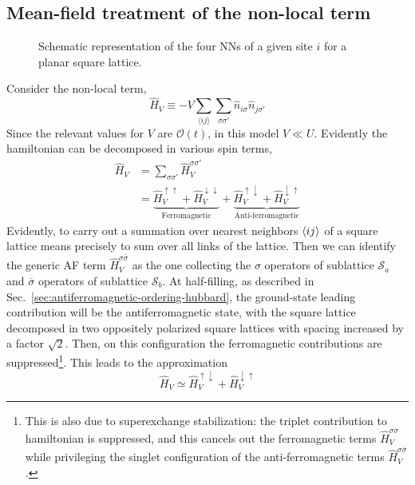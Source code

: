 \subsection{Mean-field treatment of the non-local term}

\begin{figure}
	\centering
	
	\caption{Schematic representation of the four NNs of a given site $i$ for a planar square lattice.}
	\label{fig:square-nearest-neighbors}
\end{figure}

Consider the non-local term,
\begin{equation}\label{eq:extended-hubbard-nonlocal-interaction}
	\hat H_V \equiv - V \sum_{\langle ij \rangle} \sum_{\sigma \sigma'} \hat n_{i\sigma} \hat n_{j\sigma'}
\end{equation}
{\color{tabred}Since the relevant values for $V$ are $\mathcal{O}(t)$, in this model $V \ll U$.} Evidently the hamiltonian can be decomposed in various spin terms,
\[
\begin{aligned}
	\hat H_V &= \sum_{\sigma \sigma'} \hat H_V^{\sigma\sigma'} \\
	&= \underbrace{
		\hat H_V^{\uparrow\uparrow} + \hat H_V^{\downarrow\downarrow}
	}_\text{Ferromagnetic} + \underbrace{
		\hat H_V^{\uparrow\downarrow} + \hat H_V^{\downarrow\uparrow}
	}_\text{Anti-ferromagnetic}
\end{aligned}
\]
Evidently, to carry out a summation over nearest neighbors $\ev{ij}$ of a square lattice means precisely to sum over all links of the lattice. Then we can identify the generic AF term $\hat H_V^{\sigma \overline{\sigma}}$ as the one collecting the $\sigma$ operators of sublattice $\mathcal{S}_a$ and $\overline{\sigma}$ operators of sublattice $\mathcal{S}_b$. At half-filling, as described in Sec.~\ref{sec:antiferromagnetic-ordering-hubbard}, the ground-state leading contribution will be the antiferromagnetic state, with the square lattice decomposed in two oppositely polarized square lattices with spacing increased by a factor $\sqrt{2}$. Then, on this configuration the ferromagnetic contributions are suppressed\footnote{
	This is also due to superexchange stabilization: the triplet contribution to hamiltonian is suppressed, and this cancels out the ferromagnetic terms $\hat H_V^{\sigma\sigma}$ while privileging the singlet configuration of the anti-ferromagnetic terms $\hat H_V^{\sigma\overline{\sigma}}$.
}. This leads to the approximation
\[
	\hat H_V \simeq \hat H_V^{\uparrow\downarrow} + \hat H_V^{\downarrow\uparrow}
\]

